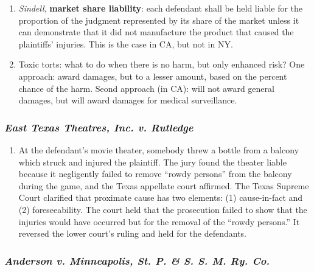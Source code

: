 \begin{enumerate}
\begin{enumerate}
    \end{enumerate}
    \item \emph{Sindell}, \textbf{market share liability}: each defendant shall be held liable for the proportion of the judgment represented by its share of the market unless it can demonstrate that it did not manufacture the product that caused the plaintiffs' injuries. This is the case in CA, but not in NY.
    \item Toxic torts: what to do when there is no harm, but only enhanced risk? One approach: award damages, but to a lesser amount, based on the percent chance of the harm. Seond approach (in CA): will not award general damages, but will award damages for medical surveillance.
\end{enumerate}

\subsubsection{\emph{East Texas Theatres, Inc. v. Rutledge}}

\begin{enumerate}
    \item At the defendant's movie theater, somebody threw a bottle from a balcony which struck and injured the plaintiff. The jury found the theater liable because it negligently failed to remove ``rowdy persons'' from the balcony during the game, and the Texas appellate court affirmed. The Texas Supreme Court clarified that proximate cause has two elements: (1) cause-in-fact and (2) foreseeability. The court held that the prosecution failed to show that the injuries would have occurred but for the removal of the ``rowdy persons.'' It reversed the lower court's ruling and held for the defendants.
\end{enumerate}

\subsubsection{\emph{Anderson v. Minneapolis, St. P. \& S. S. M. Ry. Co.}}

